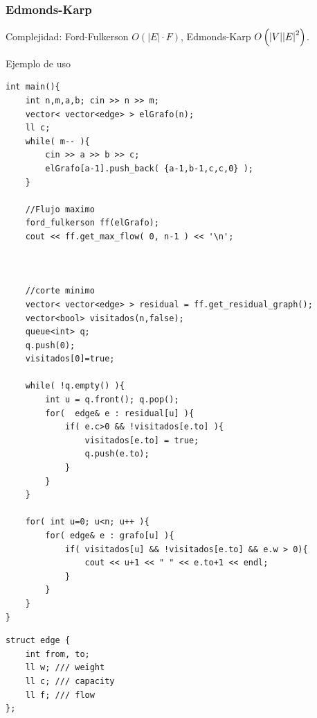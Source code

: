 \documentclass[12 pts,spanish,mexico]{article}
\numberwithin{equation}{section}
\newcommand{\pa}[1]{\left( #1 \right)}
\begin{document}
\begin{multicols}{2}
\subsubsection{Edmonds-Karp}
Complejidad: Ford-Fulkerson $O\pa{|E| \cdot F}$, Edmonds-Karp $O\pa{\abs{V}\abs{E}^2}$.

Ejemplo de uso
\begin{verbatim}
int main(){
    int n,m,a,b; cin >> n >> m;
    vector< vector<edge> > elGrafo(n);
    ll c;
    while( m-- ){
        cin >> a >> b >> c;
        elGrafo[a-1].push_back( {a-1,b-1,c,c,0} );
    }

    //Flujo maximo
    ford_fulkerson ff(elGrafo);
    cout << ff.get_max_flow( 0, n-1 ) << '\n';



    //corte minimo
    vector< vector<edge> > residual = ff.get_residual_graph();
    vector<bool> visitados(n,false);
    queue<int> q;
    q.push(0);
    visitados[0]=true;

    while( !q.empty() ){
        int u = q.front(); q.pop();
        for(  edge& e : residual[u] ){
            if( e.c>0 && !visitados[e.to] ){
                visitados[e.to] = true;
                q.push(e.to);
            }
        }
    }

    for( int u=0; u<n; u++ ){
        for( edge& e : grafo[u] ){
            if( visitados[u] && !visitados[e.to] && e.w > 0){
                cout << u+1 << " " << e.to+1 << endl;
            }
        }
    }
}
\end{verbatim}

\begin{verbatim}
struct edge {
    int from, to;
    ll w; /// weight
    ll c; /// capacity
    ll f; /// flow
};
\end{verbatim}


\end{multicols}
\end{document}
